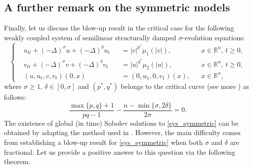 \documentclass[11pt,reqno]{amsart}
\numberwithin{equation}{section}
\begin{document}
\subsection{A further remark on the symmetric models}\label{subsec4.3}
Finally, let us discuss the blow-up result in the critical case for the following weakly coupled system of semilinear structurally damped $\sigma$-evolution equations:
\begin{equation}\label{sys_symmetric}
\left\{
\begin{aligned}
    &u_{tt}+(-\Delta)^{\sigma}u+(-\Delta)^{\delta}u_t&&=|v|^{p^*}\mu_1(|v|), &&x\in \mathbb{R}^n,\, t\geq 0,\\
    &v_{tt}+(-\Delta)^{\sigma}v+(-\Delta)^{\delta}v_t&&=|u|^{q^*}\mu_2(|u|), &&x\in \mathbb{R}^n,\, t\geq 0,\\
    &(u,u_t,v,v_t)(0,x)&&=(0,u_1,0,v_1)(x), &&x\in \mathbb{R}^n,
\end{aligned}
\right.
\end{equation}
where $\sigma\ge 1$, $\delta\in [0,\sigma]$ and $(p^*,q^*)$ belongs to the critical curve (see more \cite{Anh2020,Abbicco2025}) as follows:
\begin{equation}\label{crit3}\tag{$**$}
\frac{\max\{p,q\}+1}{pq-1}-\frac{n-\min\{\sigma,2\delta\}}{2\sigma}= 0.
\end{equation}
The existence of global (in time) Sobolev solutions to \eqref{sys_symmetric} can be obtained by adapting the method used in \cite{TangDaoCung2026}. However, the main difficulty comes from establishing a blow-up result for \eqref{sys_symmetric} when both $\sigma$ and $\delta$ are fractional. Let us provide a positive answer to this question via the following theorem.
\end{document}
